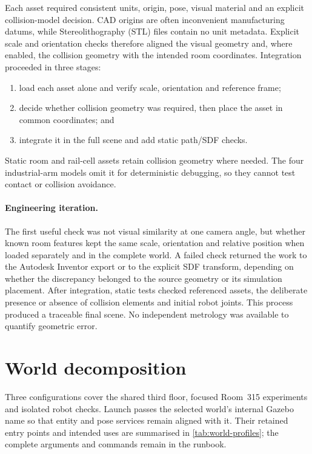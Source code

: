 Each asset required consistent units, origin, pose, visual material and
an explicit collision-model decision. CAD origins are often inconvenient
manufacturing datums, while Stereolithography (STL) files contain no unit
metadata. Explicit scale and orientation checks therefore aligned the visual
geometry and, where enabled, the collision geometry with the intended room
coordinates. Integration proceeded in three stages:

\begin{enumerate}
  \item load each asset alone and verify scale, orientation and reference frame;
  \item decide whether collision geometry was required, then place the asset in
  common coordinates; and
  \item integrate it in the full scene and add static path/SDF checks.
\end{enumerate}

Static room and rail-cell assets retain collision geometry where needed. The
four industrial-arm models omit it for deterministic debugging, so they cannot
test contact or collision avoidance.

\paragraph{Engineering iteration.}
The first useful check was not visual similarity at one camera angle, but whether
known room features kept the same scale, orientation and relative position when
loaded separately and in the complete world. A failed check returned the work to
the Autodesk Inventor export or to the explicit SDF transform, depending on
whether the discrepancy belonged to the source geometry or its simulation
placement. After integration, static tests checked referenced assets, the
deliberate presence or absence of collision elements and initial robot joints.
This process produced a traceable final scene. No independent metrology was
available to quantify geometric error.

\section{World decomposition}

Three configurations cover the shared third floor, focused Room~315 experiments
and isolated robot checks. Launch passes the selected world's internal Gazebo
name so that entity and pose services remain aligned with it. Their retained
entry points and intended uses are summarised in \cref{tab:world-profiles}; the
complete arguments and commands remain in the runbook.

